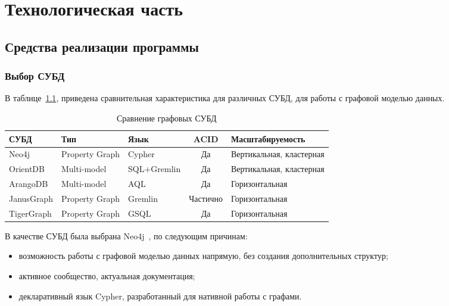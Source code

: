 \chapter{Технологическая часть}

\section{Средства реализации программы}

\subsection{Выбор СУБД}

В таблице~\ref{tbl:subd}, приведена сравнительная характеристика для различных СУБД, для работы с графовой моделью данных.

\begin{table}[H]
\centering
\begin{threeparttable}
\caption{Сравнение графовых СУБД}
\begin{tabular}{|l|l|l|c|p{5cm}|}
\hline
\textbf{СУБД} & \textbf{Тип} & \textbf{Язык} & \textbf{ACID} & \textbf{Масштабируемость} \\
\hline
Neo4j         & Property Graph & Cypher        & Да   & Вертикальная, кластерная \\
\hline
OrientDB      & Multi-model    & SQL+Gremlin   & Да   & Вертикальная, кластерная \\
\hline
ArangoDB      & Multi-model    & AQL           & Да   & Горизонтальная            \\
\hline
JanusGraph    & Property Graph & Gremlin       & Частично & Горизонтальная        \\
\hline
TigerGraph    & Property Graph & GSQL          & Да   & Горизонтальная            \\
\hline
\end{tabular}
\label{tbl:subd}
\end{threeparttable}
\end{table}

В качестве СУБД была выбрана Neo4j~\cite{neo4j}, по следующим причинам:
\begin{itemize}
    \item возможность работы с графовой моделью данных напрямую, без создания дополнительных структур;
    \item активное сообщество, актуальная документация;
    \item декларативный язык Cypher, разработанный для нативной работы с графами.
\end{itemize}


